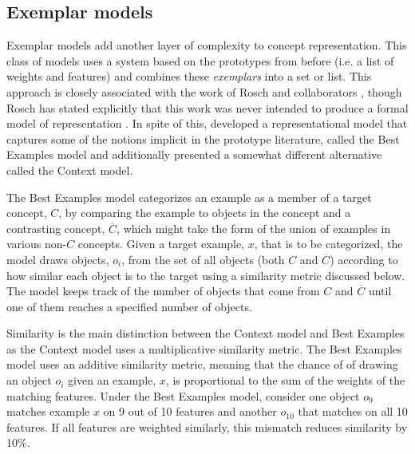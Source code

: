 \documentclass[doc,floatsintext]{apa6}
\begin{document}
\subsection{Exemplar models}


Exemplar models add another layer of complexity to concept representation.
This class of models uses a system based on the prototypes from before (i.e. a list of weights and features) and combines these \emph{exemplars} into a set or list.
This approach is closely associated with the work of Rosch and collaborators \citep{mervis1980,roschm1975}, though Rosch has stated explicitly that this work was never intended to produce a formal model of representation \citep{rosch1999}.
In spite of this, \citet{smithm1981} developed a representational model that captures some of the notions implicit in the prototype literature, called the Best Examples model and additionally presented a somewhat different alternative called the Context model.




The Best Examples model categorizes an example as a member of a target concept, $C$, by comparing the example to objects in the concept and a contrasting concept, $\overline{C}$, which might take the form of the union of examples in various non-$C$ concepts.
Given a target example, $x$, that is to be categorized, the model draws objects, $o_i$, from the set of all objects (both $C$ and $\overline{C}$) according to how similar each object is to the target using a similarity metric discussed below.
The model keeps track of the number of objects that come from  $C$ and $\overline{C}$ until one of them reaches a specified number of objects.

Similarity is the main distinction between the Context model and Best Examples as the Context model uses a multiplicative similarity metric.
The Best Examples model uses an additive similarity metric, meaning that the chance of of drawing an object $o_i$ given an example, $x$, is proportional to the sum of the weights of the matching features.
Under the Best Examples model, consider one object $o_9$ matches example $x$ on 9 out of 10 features and another $o_10$ that matches on all 10 features.
If all features are weighted similarly, this mismatch reduces similarity by 10\%.
\end{document}

